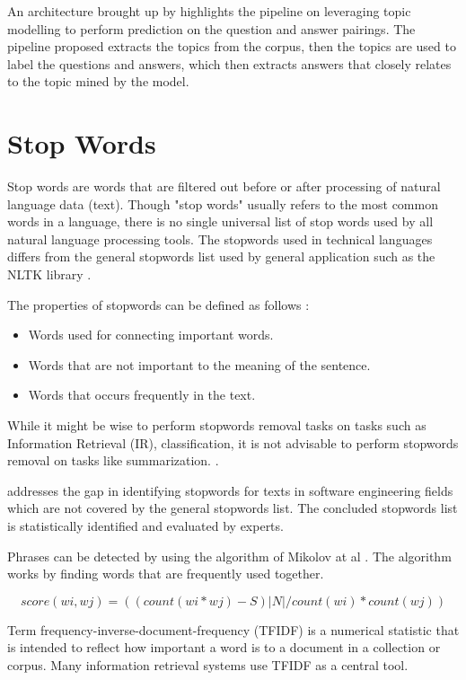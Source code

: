An architecture brought up by \cite{6227139} highlights the pipeline on leveraging topic modelling to perform prediction on the question and answer pairings. The pipeline proposed extracts the topics from the corpus, then the topics are used to label the questions and answers, which then extracts answers that closely relates to the topic mined by the model.

\pagebreak

\section{Stop Words}
Stop words are words that are filtered out before or after processing of natural language data (text). Though "stop words" usually refers to the most common words in a language, there is no single universal list of stop words used by all natural language processing tools. The stopwords used in technical languages differs from the general stopwords list used by general application such as the NLTK library \cite{stopwords_1} \cite{stopwords_2}.

The properties of stopwords can be defined as follows \cite{9074166}:
  \begin{itemize}
    \item Words used for connecting important words.
    \item Words that are not important to the meaning of the sentence.
    \item  Words that occurs frequently in the text.
  \end{itemize}


While it might be wise to perform stopwords removal tasks on tasks such as Information Retrieval (IR), classification, it is not advisable to perform stopwords removal on tasks like summarization. \cite{9074166}.

\cite{stopwords_1} addresses the gap in identifying stopwords for texts in software engineering fields which are not covered by the general stopwords list. The concluded stopwords list is statistically identified and evaluated by experts. 

Phrases can be detected by using the algorithm of Mikolov at al \cite{NIPS2013_9aa42b31}. The algorithm works by finding words that are frequently used together.

\[ score(wi, wj) = ((count(wi*wj) - S)|N| / count(wi) * count(wj)) \]

Term frequency-inverse-document-frequency (TFIDF) is a numerical statistic that is intended to reflect how important a word is to a document in a collection or corpus. Many information retrieval systems use TFIDF as a central tool.

